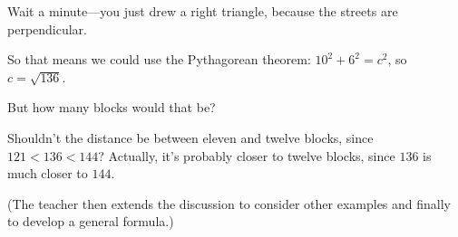 {{\begin{scriptlist}
  \item[Student 3:] Wait a minute---you just drew a right triangle, because the streets are perpendicular.

  \item[Student 4:] So that means we could use the Pythagorean theorem: $10^2+6^2=c^2$, so $c=\sqrt{136}$.

  \item[Student 2:] But how many blocks would that be?

  \item[Student 3:] Shouldn't the distance be between eleven and twelve blocks, since $121 < 136 < 144$? Actually, it's probably closer to twelve blocks, since $136$ is much closer to $144$.

  (The teacher then extends the discussion to consider other examples and finally to develop a general formula.)
  \end{scriptlist}}
}
